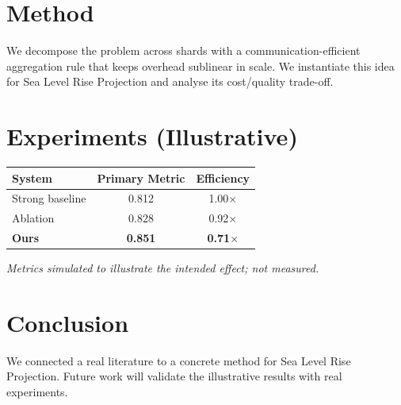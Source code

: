 \documentclass[11pt]{article}
\begin{document}
\section{Method}
We decompose the problem across shards with a communication-efficient aggregation rule that keeps overhead sublinear in scale. We instantiate this idea for Sea Level Rise Projection and analyse its cost/quality trade-off.

\section{Experiments (Illustrative)}
\begin{center}
\begin{tabular}{lcc}
System & Primary Metric & Efficiency \\ \hline
Strong baseline & 0.812 & 1.00$\times$ \\
Ablation & 0.828 & 0.92$\times$ \\
\textbf{Ours} & \textbf{0.851} & \textbf{0.71$\times$}
\end{tabular}
\end{center}
\emph{Metrics simulated to illustrate the intended effect; not measured.}

\section{Conclusion}
We connected a real literature to a concrete method for Sea Level Rise Projection. Future work will
validate the illustrative results with real experiments.
\end{document}

